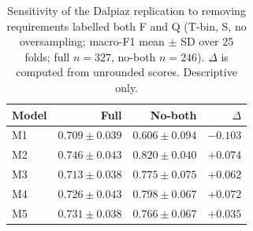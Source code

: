 \begin{table}[H]
\centering
\caption{Sensitivity of the Dalpiaz replication to removing requirements labelled both F and Q (T-bin, S, no oversampling; macro-F1 mean $\pm$ SD over 25 folds; full $n=327$, no-both $n=246$). $\Delta$ is computed from unrounded scores. Descriptive only.}
\label{tab:noboth}
\small
\setlength{\tabcolsep}{4pt}
\begin{tabular}{lrrr}
\toprule
Model & Full & No-both & $\Delta$ \\
\midrule
M1 & $0.709 \pm 0.039$ & $0.606 \pm 0.094$ & $-0.103$ \\
M2 & $0.746 \pm 0.043$ & $0.820 \pm 0.040$ & $+0.074$ \\
M3 & $0.713 \pm 0.038$ & $0.775 \pm 0.075$ & $+0.062$ \\
M4 & $0.726 \pm 0.043$ & $0.798 \pm 0.067$ & $+0.072$ \\
M5 & $0.731 \pm 0.038$ & $0.766 \pm 0.067$ & $+0.035$ \\
\bottomrule
\end{tabular}
\end{table}
